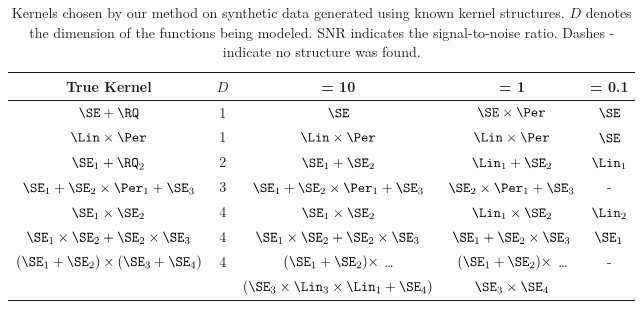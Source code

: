 %
%
\begin{table}[ht!]
\caption[Kernels chosen on synthetic data generated using known kernel structures]
{%
Kernels chosen by our method on synthetic data generated using known kernel structures. $D$ denotes the dimension of the functions being modeled.  SNR indicates the signal-to-noise ratio. Dashes - indicate no structure was found.
}
\label{tbl:synthetic}
\begin{center}
{\small
\begin{tabular}{c c | c c c}
True Kernel & $D$ & \SNR{} = 10 & \SNR{} = 1 & \hspace{-1cm} \SNR{} = 0.1 \\
\hline
$\SE + \RQ$        & 1 & $\SE$ & $\SE \times \Per$ & $\SE$ \\
$\Lin \times \Per$ & 1 & $\Lin \times \Per$ & $\Lin \times \Per$ & $\SE$ \\
$\SE_1 + \RQ_2$    & 2 & $\SE_1 + \SE_2$ & $\Lin_1 + \SE_2$ & $\Lin_1$ \\
$\SE_1 + \SE_2 \times \Per_1 + \SE_3$ & 3 & $\SE_1 + \SE_2 \times \Per_1 + \SE_3$ & $\SE_2 \times \Per_1 + \SE_3$ & - \\
$\SE_1 \times \SE_2$ & 4 & $\SE_1 \times \SE_2$ & $\Lin_1 \times \SE_2$ & $\Lin_2$ \\
$\SE_1 \times \SE_2 + \SE_2 \times \SE_3$ & 4 & $\SE_1 \times \SE_2 + \SE_2 \times \SE_3$ & $\SE_1 + \SE_2 \times \SE_3$ & $\SE_1$ \\
\multirow{2}{*}{ $(\SE_1 + \SE_2) \times (\SE_3 + \SE_4)$ } & \multirow{2}{*}{4} & $(\SE_1 + \SE_2) \times$ \dots & $(\SE_1 + \SE_2) \times$ \dots & \multirow{2}{*}{-} \\
 & & $(\SE_3\times\Lin_3\times\Lin_1 + \SE_4)$ & $\SE_3 \times \SE_4$ &
\end{tabular}
}
\end{center}
\end{table}

%
%

